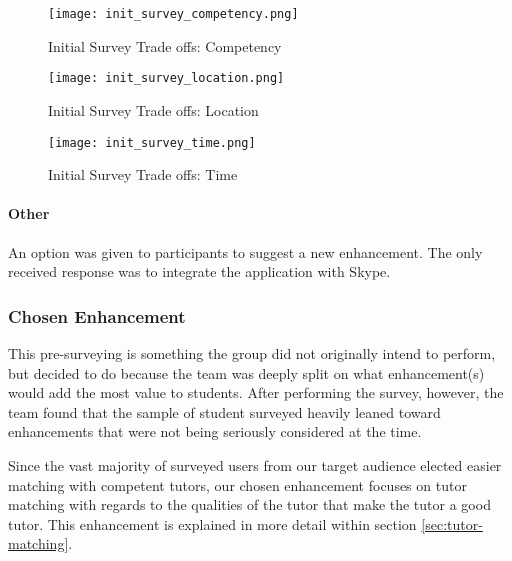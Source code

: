 \begin{figure}[ht]
  \caption{Initial Survey Trade offs: Competency}
  \centering
    \label{fig:init_survey_competency}
    \texttt{[image: init\_survey\_competency.png]}
\end{figure}

\begin{figure}[ht]
  \caption{Initial Survey Trade offs: Location} 
  \centering
    \label{fig:init_survey_location}
    \texttt{[image: init\_survey\_location.png]}
\end{figure}

\begin{figure}[ht]
  \caption{Initial Survey Trade offs: Time} 
  \centering
    \label{fig:init_survey_time}
    \texttt{[image: init\_survey\_time.png]}
\end{figure}

\paragraph{Other} An option was given to participants to suggest a new
enhancement. The only received response was to integrate the
application with Skype.


\subsubsection{Chosen Enhancement}
This pre-surveying is something the group did not originally intend to perform,
but decided to do because the team was deeply split on what enhancement(s) would
add the most value to students. After performing the survey, however, the team
found that the sample of student surveyed heavily leaned toward enhancements
that were not being seriously considered at the time.

Since the vast majority of surveyed users from our target audience elected
easier matching with competent tutors, our chosen enhancement focuses on tutor
matching with regards to the qualities of the tutor that make the tutor a good
tutor. This enhancement is explained in more detail within section
\ref{sec:tutor-matching}.

